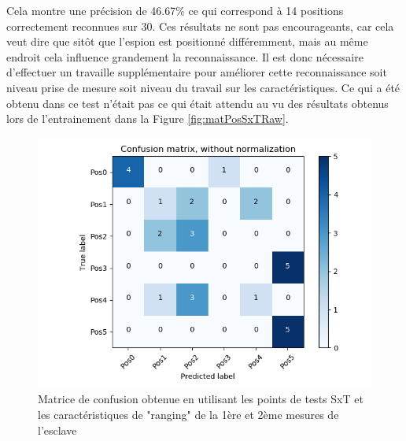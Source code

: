 Cela montre une précision de 46.67\% ce qui correspond à 14 positions correctement reconnues sur 30. Ces résultats ne sont pas encourageants, car cela veut dire que sitôt que l'espion est positionné différemment, mais au même endroit cela influence grandement la reconnaissance. Il est donc nécessaire d'effectuer un travaille supplémentaire pour améliorer cette reconnaissance soit niveau prise de mesure soit niveau du travail sur les caractéristiques. Ce qui a été obtenu dans ce test n'était pas ce qui était attendu au vu des résultats obtenus lors de l'entrainement dans la Figure \ref{fig:matPosSxTRaw}.
\begin{figure}[htp]
 \begin{center}
  \includegraphics[scale=0.5]{figures/mat_pos_SxT_rawall.png}
  \caption{Matrice de confusion obtenue en utilisant les points de tests SxT et les caractéristiques de "ranging" de la 1ère et 2ème mesures de l'esclave}
  \label{fig:matPosSxTRawall} %
 \end{center}
\end{figure}


